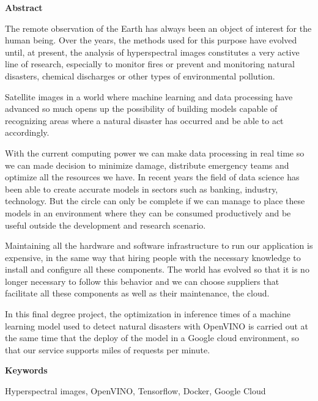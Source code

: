\begin{center}
{\bf \Huge Abstract}

\end{center}

The remote observation of the Earth has always been an object of interest for the human being.
Over the years, the methods used for this purpose have evolved until, at present, the analysis of hyperspectral images constitutes a very active line of research, especially
to monitor fires or prevent and monitoring natural disasters, chemical discharges or other types of environmental pollution.

Satellite images in a world where machine learning and data processing have advanced so much opens up the possibility of building models capable of recognizing areas where a natural
disaster has occurred and be able to act accordingly.

With the current computing power we can make data processing in real time so we can made decision to minimize damage, distribute emergency teams and optimize all the resources we have.
In recent years the field of data science has been able to create accurate models in sectors such as banking, industry, technology.
But the circle can only be complete if we can manage to place these models in an environment where they can be consumed productively and be useful outside the development and research scenario.

Maintaining all the hardware and software infrastructure to run our application is expensive, in the same way that hiring people with the necessary
knowledge to install and configure all these components.
The world has evolved so that it is no longer necessary to follow this behavior and we can choose suppliers that facilitate all these components as well as their maintenance, the cloud.

In this final degree project, the optimization in inference times of a machine learning model used to detect natural disasters with OpenVINO is carried out at the same time that the
deploy of the model in a Google cloud environment, so that our service supports miles of requests per minute.

\vspace{0.8cm}
\begin{center}

{\bf \Large Keywords}

\end{center}


Hyperspectral images, OpenVINO, Tensorflow, Docker, Google Cloud
\vspace{0.5cm}

\mbox{}
